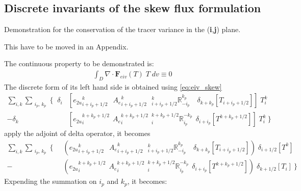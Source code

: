 \documentclass[../tex_main/NEMO_manual]{subfiles}
\begin{document}
$\ $\newpage      %
\subsection{Discrete invariants of the skew flux formulation}
\label{subsec:eiv_skew}


Demonstration for the conservation of the tracer variance in the (\textbf{i},\textbf{j}) plane. 

This have to be moved in an Appendix.

The continuous property to be demonstrated is:
\begin{align*}
\int_D \nabla \cdot \textbf{F}_{eiv}(T) \; T \;dv  \equiv 0
\end{align*}
The discrete form of its left hand side is obtained using \autoref{eq:eiv_skew}
\begin{align*}
 \sum\limits_{i,k} \sum_{\substack{i_p,\,k_p}}  \Biggl\{   \;\;
 \delta_i  &\left[                                                    
{e_{2u}}_{i+i_p+1/2}^{k}                                  \;\ \ {A_{e}}_{i+i_p+1/2}^{k} 
\ \ \ { _{i+i_p+1/2}^k \mathbb{R}_{-i_p}^{k_p} }   \quad \delta_{k+k_p}[T_{i+i_p+1/2}]         
   \right] \; T_i^k      \\
- \delta_k &\left[ 
{e_{2u}}_i^{k+k_p+1/2}                                     \ \ {A_{e}}_i^{k+k_p+1/2} 
\ \ { _i^{k+k_p+1/2} \mathbb{R}_{i_p}^{-k_p} }   \ \ \delta_{i+i_p}[T^{k+k_p+1/2}]   
   \right] \; T_i^k      \         \Biggr\}   
\end{align*}
apply the adjoint of delta operator, it becomes
\begin{align*}
 \sum\limits_{i,k} \sum_{\substack{i_p,\,k_p}}  \Biggl\{   \;\;
  &\left(                                                    
{e_{2u}}_{i+i_p+1/2}^{k}                                  \;\ \ {A_{e}}_{i+i_p+1/2}^{k} 
\ \ \ { _{i+i_p+1/2}^k \mathbb{R}_{-i_p}^{k_p} }   \quad \delta_{k+k_p}[T_{i+i_p+1/2}]         
   \right) \; \delta_{i+1/2}[T^{k}]      \\
- &\left( 
{e_{2u}}_i^{k+k_p+1/2}                                     \ \ {A_{e}}_i^{k+k_p+1/2} 
\ \ { _i^{k+k_p+1/2} \mathbb{R}_{i_p}^{-k_p} }   \ \ \delta_{i+i_p}[T^{k+k_p+1/2}]   
     \right) \; \delta_{k+1/2}[T_{i}]       \         \Biggr\}       
\end{align*}
Expending the summation on $i_p$ and $k_p$, it becomes:
\end{document}
